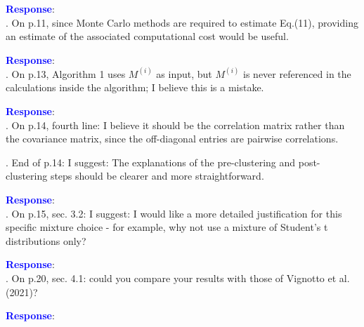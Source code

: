 \documentclass[a4paper,12pt]{article}
\begin{document}
\noindent \textcolor{blue}{\bf Response}: \\


{\color{blue}
. On p.11, since Monte Carlo methods are required to estimate Eq.(11), providing an estimate of the associated computational cost would be useful.
}

\noindent \textcolor{blue}{\bf Response}: \\


{\color{blue}
. On p.13, Algorithm 1 uses $M^(i)$ as input, but $M^(i)$ is never referenced in the calculations inside the algorithm; I believe this is a mistake.
}

\noindent \textcolor{blue}{\bf Response}: \\


{\color{blue}
. On p.14, fourth line: I believe it should be the correlation matrix rather than the covariance matrix, since the off-diagonal entries are pairwise correlations.
}


{\color{blue}
. End of p.14: I suggest: The explanations of the pre-clustering and post-clustering steps should be clearer and more straightforward.
}

\noindent \textcolor{blue}{\bf Response}: \\


{\color{blue}
. On p.15, sec. 3.2: I suggest: I would like a more detailed justification for this specific mixture choice - for example, why not use a mixture of Student's t distributions only?
}

\noindent \textcolor{blue}{\bf Response}: \\


{\color{blue}
. On p.20, sec. 4.1: could you compare your results with those of Vignotto et al. (2021)?
}

\noindent \textcolor{blue}{\bf Response}: \\


{\small

}
\end{document}
